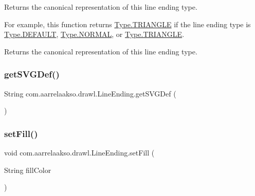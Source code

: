 Returns the canonical representation of this line ending type. 

For example, this function returns \hyperlink{enumcom_1_1aarrelaakso_1_1drawl_1_1_line_ending_1_1_type_a175880412926b2126d70c22ae7396009}{Type.\+T\+R\+I\+A\+N\+G\+LE} if the line ending type is \hyperlink{enumcom_1_1aarrelaakso_1_1drawl_1_1_line_ending_1_1_type_a60839eb2ed0486a6f9f987c64d27e313}{Type.\+D\+E\+F\+A\+U\+LT}, \hyperlink{enumcom_1_1aarrelaakso_1_1drawl_1_1_line_ending_1_1_type_a1f96f154af5043259b200495ec8b2af6}{Type.\+N\+O\+R\+M\+AL}, or \hyperlink{enumcom_1_1aarrelaakso_1_1drawl_1_1_line_ending_1_1_type_a175880412926b2126d70c22ae7396009}{Type.\+T\+R\+I\+A\+N\+G\+LE}.

\begin{DoxyReturn}{Returns}
the canonical representation of this line ending type. 
\end{DoxyReturn}
\mbox{\label{classcom_1_1aarrelaakso_1_1drawl_1_1_line_ending_a30fe25c0bc92fe34abffcd1b16248605}} 
\subsubsection{\texorpdfstring{get\+S\+V\+G\+Def()}{getSVGDef()}}
{\footnotesize\ttfamily String com.\+aarrelaakso.\+drawl.\+Line\+Ending.\+get\+S\+V\+G\+Def (\begin{DoxyParamCaption}{ }\end{DoxyParamCaption})\hspace{0.3cm}{\ttfamily [protected]}}

\mbox{\label{classcom_1_1aarrelaakso_1_1drawl_1_1_line_ending_a4ce6efbfc8ed0129482c6105ded54877}} 
\subsubsection{\texorpdfstring{set\+Fill()}{setFill()}}
{\footnotesize\ttfamily void com.\+aarrelaakso.\+drawl.\+Line\+Ending.\+set\+Fill (\begin{DoxyParamCaption}\item[{String}]{fill\+Color }\end{DoxyParamCaption})}



